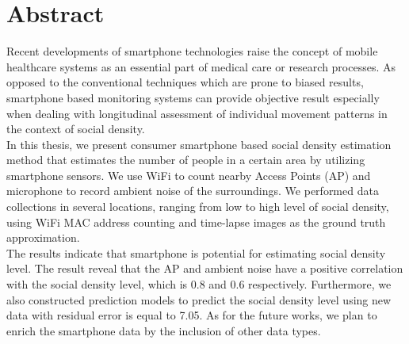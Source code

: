 \begingroup
\let\clearpage\relax
\let\cleardoublepage\relax
\let\cleardoublepage\relax

\chapter*{Abstract}
Recent developments of smartphone technologies raise the concept of mobile healthcare systems as an essential part of medical care or research processes. As opposed to the conventional techniques which are prone to biased results, smartphone based monitoring systems can provide objective result especially when dealing with longitudinal assessment of individual movement patterns in the context of social density.\\

\noindent
In this thesis, we present consumer smartphone based social density estimation method that estimates the number of people in a certain area by utilizing smartphone sensors. We use WiFi to count nearby Access Points (AP) and microphone to record ambient noise of the surroundings. We performed data collections in several locations, ranging from low to high level of social density, using WiFi MAC address counting and time-lapse images as the ground truth approximation.\\

\noindent
The results indicate that smartphone is potential for estimating social density level. The result reveal that the AP and ambient noise have a positive correlation with the social density level, which is 0.8 and 0.6 respectively. Furthermore, we also constructed prediction models to predict the social density level using new data with residual error is equal to 7.05. As for the future works, we plan to enrich the smartphone data by the inclusion of other data types.

\endgroup			

\vfill